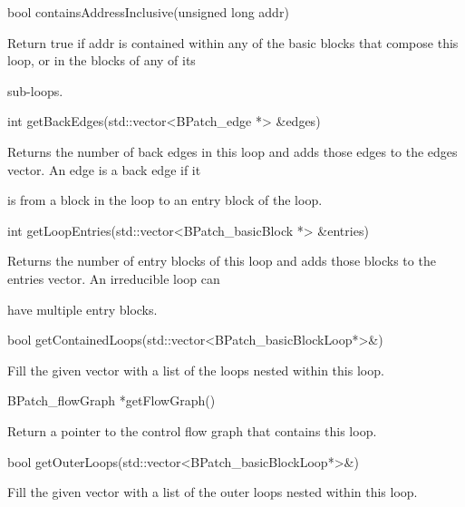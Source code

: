 {

bool containsAddressInclusive(unsigned long addr)}



{

Return true if addr is contained within any of the basic blocks that compose this loop, or in the blocks of any of its

sub-loops.}



{

int getBackEdges(std::vector<BPatch_edge *> &edges)}



{

Returns the number of back edges in this loop and adds those edges to the edges vector. An edge is a back edge if it

is from a block in the loop to an entry block of the loop.}



{

int getLoopEntries(std::vector<BPatch_basicBlock *> &entries)}



{

Returns the number of entry blocks of this loop and adds those blocks to the entries vector. An irreducible loop can

have multiple entry blocks.}



{

bool getContainedLoops(std::vector<BPatch_basicBlockLoop*>&)}



{

Fill the given vector with a list of the loops nested within this loop.}



{

BPatch_flowGraph *getFlowGraph()}



{

Return a pointer to the control flow graph that contains this loop.}



{

bool getOuterLoops(std::vector<BPatch_basicBlockLoop*>&)}



{

Fill the given vector with a list of the outer loops nested within this loop.}




